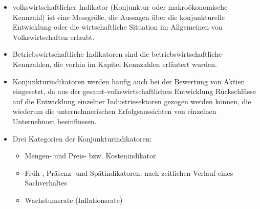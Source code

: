 \begin{itemize}
    \item volkswirtschaftlicher Indikator (Konjunktur oder makroökonomische Kennzahl) ist eine Messgröße, die Aussagen über die konjunkturelle Entwicklung oder die wirtschaftliche Situation im Allgemeinen von Volkswirtschaften erlaubt.

    \item Betriebswirtschaftliche Indikatoren sind die betriebswirtschaftliche Kennzahlen, die vorhin im Kapitel Kennzahlen erläutert wurden.

    \item Konjunkturindikatoren werden häufig auch bei der Bewertung von Aktien eingesetzt, da aus der gesamt-volkswirtschaftlichen Entwicklung Rückschlüsse auf die Entwicklung einzelner Industriesektoren gezogen werden können, die wiederum die unternehmerischen Erfolgsaussichten von einzelnen Unternehmen beeinflussen.

    \item Drei Kategorien der Konjunkturindikatoren:
    \begin{itemize}
        \item Mengen- und Preis- bzw. Kostenindikator
        \item Früh-, Präsenz- und Spätindikatoren: nach zeitlichen Verlauf eines Sachverhaltes
        \item Wachstumsrate (Inflationsrate)
    \end{itemize}
\end{itemize}
